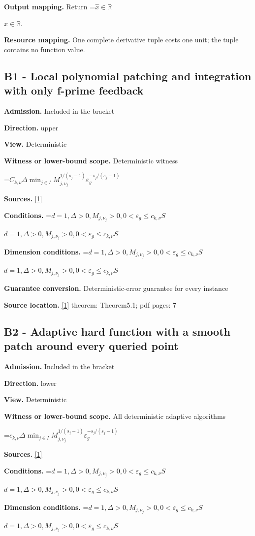 \documentclass[10pt,a4paper]{article}
\newcommand{\AtlasMath}[1]{\par\begingroup\centering\setbox0=\hbox{$\displaystyle #1$}\ifdim\wd0>1.4\linewidth\typeout{ATLAS WIDE FORMULA: \the\wd0}\fi\ifdim\wd0>\linewidth\resizebox{\linewidth}{!}{\box0}\else\box0\fi\par\endgroup}
\newcommand{\AtlasInlineMath}[1]{\begingroup\setbox0=\hbox{$#1$}\ifdim\wd0>.4\linewidth\endgroup\AtlasMath{#1}\else\endgroup$#1$\fi}
\begin{document}
\textbf{Output mapping.} Return \AtlasInlineMath{\widehat{x}\in \mathbb{R}}.

\textbf{Resource mapping.} One complete derivative tuple costs one unit; the tuple contains no function value.

\subsection{B1 - Local polynomial patching and integration with only f-prime feedback}
\textbf{Admission.} Included in the bracket

\textbf{Direction.} upper

\textbf{View.} Deterministic

\textbf{Witness or lower-bound scope.} Deterministic witness

\AtlasMath{C_{k,\nu} \Delta \min_{j\in I} M_{j,\nu_j}^{1/(s_j-1)} \varepsilon_g^{-s_j/(s_j-1)}}
\textbf{Sources.} \href{https://arxiv.org/abs/2610.16295}{[1]}

\textbf{Conditions.} \AtlasInlineMath{d=1,\Delta>0,M_{j,\nu_j}>0,0<\varepsilon_g\le c_{k,\nu}S}

\textbf{Dimension conditions.} \AtlasInlineMath{d=1,\Delta>0,M_{j,\nu_j}>0,0<\varepsilon_g\le c_{k,\nu}S}

\textbf{Guarantee conversion.} Deterministic-error guarantee for every instance

\textbf{Source location.} \href{https://arxiv.org/abs/2610.16295}{[1]} theorem: Theorem5.1; pdf pages: 7

\subsection{B2 - Adaptive hard function with a smooth patch around every queried point}
\textbf{Admission.} Included in the bracket

\textbf{Direction.} lower

\textbf{View.} Deterministic

\textbf{Witness or lower-bound scope.} All deterministic adaptive algorithms

\AtlasMath{c_{k,\nu} \Delta \min_{j\in I} M_{j,\nu_j}^{1/(s_j-1)} \varepsilon_g^{-s_j/(s_j-1)}}
\textbf{Sources.} \href{https://arxiv.org/abs/2610.16295}{[1]}

\textbf{Conditions.} \AtlasInlineMath{d=1,\Delta>0,M_{j,\nu_j}>0,0<\varepsilon_g\le c_{k,\nu}S}

\textbf{Dimension conditions.} \AtlasInlineMath{d=1,\Delta>0,M_{j,\nu_j}>0,0<\varepsilon_g\le c_{k,\nu}S}
\end{document}
